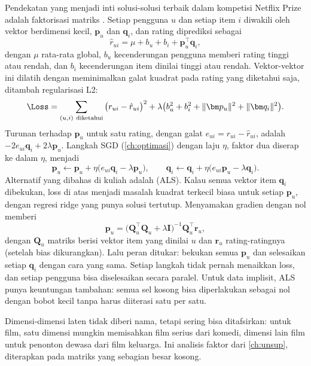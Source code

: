 Pendekatan yang menjadi inti solusi-solusi terbaik dalam kompetisi Netflix Prize adalah faktorisasi
matriks \citep{koren2009}. Setiap
pengguna $u$ dan setiap item $i$ diwakili oleh vektor berdimensi kecil, $\bm p_u$ dan $\bm q_i$, dan rating
diprediksi sebagai
\begin{equation}
\hat r_{ui}=\mu+b_u+b_i+\bm p_u^\top\bm q_i,
\end{equation}
dengan $\mu$ rata-rata global, $b_u$ kecenderungan pengguna memberi rating tinggi atau rendah, dan $b_i$
kecenderungan item dinilai tinggi atau rendah. Vektor-vektor ini dilatih dengan meminimalkan galat
kuadrat pada rating yang diketahui saja, ditambah regularisasi L2:
\begin{equation}
\Loss=\sum_{(u,i)\ \text{diketahui}}\big(r_{ui}-\hat r_{ui}\big)^2+\lambda\big(b_u^2+b_i^2+\|\bm p_u\|^2+\|\bm q_i\|^2\big).
\end{equation}
Turunan terhadap $\bm p_u$ untuk satu rating, dengan galat $e_{ui}=r_{ui}-\hat r_{ui}$, adalah
$-2e_{ui}\bm q_i+2\lambda\bm p_u$. Langkah SGD (\cref{ch:optimasi}) dengan laju $\eta$, faktor dua diserap ke
dalam $\eta$, menjadi
\begin{equation}
\bm p_u\leftarrow\bm p_u+\eta\big(e_{ui}\bm q_i-\lambda\bm p_u\big),\qquad
\bm q_i\leftarrow\bm q_i+\eta\big(e_{ui}\bm p_u-\lambda\bm q_i\big).
\end{equation}
Alternatif yang dibahas di kuliah adalah  (ALS). Kalau semua vektor item
$\bm q_i$ dibekukan, loss di atas menjadi masalah kuadrat terkecil biasa untuk setiap $\bm p_u$, dengan regresi ridge yang
punya solusi tertutup. Menyamakan gradien dengan nol memberi
\begin{equation}
\bm p_u=\big(\bm Q_u^\top\bm Q_u+\lambda\bm I\big)^{-1}\bm Q_u^\top\bm r_u,
\end{equation}
dengan $\bm Q_u$ matriks berisi vektor item yang dinilai $u$ dan $\bm r_u$ rating-ratingnya (setelah bias dikurangkan).
Lalu peran ditukar: bekukan semua $\bm p_u$ dan selesaikan setiap $\bm q_i$ dengan cara yang sama. Setiap langkah tidak
pernah menaikkan loss, dan setiap pengguna bisa diselesaikan secara paralel. Untuk data implisit, ALS punya
keuntungan tambahan: semua sel kosong bisa diperlakukan sebagai nol dengan bobot kecil tanpa harus diiterasi satu
per satu.

Dimensi-dimensi laten tidak diberi nama, tetapi sering bisa ditafsirkan: untuk film, satu dimensi
mungkin memisahkan film serius dari komedi, dimensi lain film untuk penonton dewasa dari film keluarga.
Ini analisis faktor dari \cref{ch:unsup}, diterapkan pada matriks yang sebagian besar kosong.

